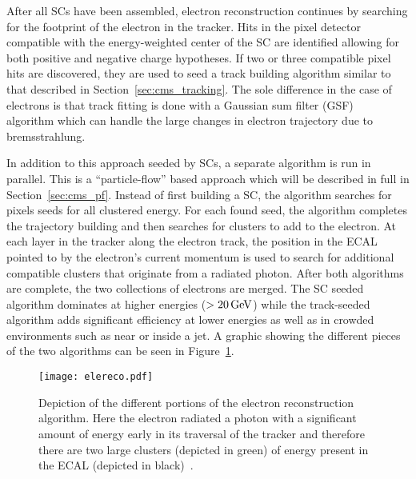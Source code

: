After all SCs have been assembled, electron reconstruction continues by
searching for the footprint of the electron in the tracker. Hits in the pixel
detector compatible with the energy-weighted center of the SC are
identified allowing for both positive and negative charge hypotheses. If two
or three compatible pixel hits are discovered, they are used to seed a track
building algorithm similar to that described in Section~\ref{sec:cms_tracking}.
The sole difference in the case of electrons is that track fitting is done with
a Gaussian sum filter (GSF)~\cite{gsf} algorithm which can handle the large
changes in electron trajectory due to bremsstrahlung.

In addition to this approach seeded by SCs, a separate algorithm is run in
parallel. This is a ``particle-flow'' based approach which will be described
in full in Section~\ref{sec:cms_pf}. Instead of first building a SC, the
algorithm searches for pixels seeds for all clustered energy. For each found
seed, the algorithm completes the trajectory building and then searches for
clusters to add to the electron. At each layer in the tracker along the
electron track, the position in the ECAL pointed to by the electron's current
momentum is used to search for additional compatible clusters that originate
from a radiated photon. After both algorithms are complete, the two collections
of electrons are merged. The SC seeded algorithm dominates at higher energies
($>20 \,\text{Ge\hspace{-.08em}V}$) while the track-seeded algorithm adds significant efficiency at
lower energies as well as in crowded environments such as near or inside a jet.
A graphic showing the different pieces of the two algorithms can be seen in
Figure~\ref{fig:cms_elereco}.

\begin{figure}[tbhp]
\begin{center}
\texttt{[image: elereco.pdf]}
\caption[Depiction of the different portions of the electron reconstruction algorithm]
{\label{fig:cms_elereco}
Depiction of the different portions of the electron reconstruction algorithm.
Here the electron radiated a photon with a significant amount of energy early
in its traversal of the tracker and therefore there are two large clusters
(depicted in green) of energy present in the ECAL (depicted in black)~\cite{bourge}.
}
\end{center}
\end{figure}

